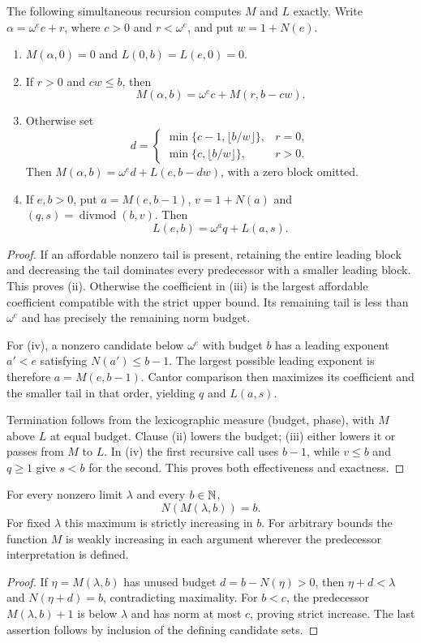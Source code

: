 \begin{theorem}\label{thm:maximum-predecessor}
The following simultaneous recursion computes $M$ and $L$ exactly.
Write $\alpha=\omega^e c+r$, where $c>0$ and $r<\omega^e$, and
put $w=1+N(e)$.
\begin{enumerate}[label=(\roman*)]
\item $M(\alpha,0)=0$ and $L(0,b)=L(e,0)=0$.
\item If $r>0$ and $cw\le b$, then
\[
 M(\alpha,b)=\omega^e c+M(r,b-cw).
\]
\item Otherwise set
\[
 d=\begin{cases}
 \min\{c-1,\lfloor b/w\rfloor\},&r=0,\\
 \min\{c,\lfloor b/w\rfloor\},&r>0.
 \end{cases}
\]
Then $M(\alpha,b)=\omega^e d+L(e,b-dw)$, with a zero block
omitted.
\item If $e,b>0$, put $a=M(e,b-1)$, $v=1+N(a)$ and
$(q,s)=\operatorname{divmod}(b,v)$.  Then
\[
 L(e,b)=\omega^a q+L(a,s).
\]
\end{enumerate}
\end{theorem}
\begin{proof}
If an affordable nonzero tail is present, retaining the entire leading
block and decreasing the tail dominates every predecessor with a smaller
leading block.  This proves (ii).  Otherwise the coefficient in (iii)
is the largest affordable coefficient compatible with the strict upper
bound.  Its remaining tail is less than $\omega^e$ and has precisely
the remaining norm budget.

For (iv), a nonzero candidate below $\omega^e$ with budget $b$ has
a leading exponent $a'<e$ satisfying $N(a')\le b-1$.
The largest possible leading exponent is therefore $a=M(e,b-1)$.
Cantor comparison then maximizes its coefficient and the smaller tail
in that order, yielding $q$ and $L(a,s)$.

Termination follows from the lexicographic measure (budget, phase),
with $M$ above $L$ at equal budget.  Clause (ii) lowers the budget;
(iii) either lowers it or passes from $M$ to $L$.  In (iv) the first
recursive call uses $b-1$, while $v\le b$ and $q\ge1$ give $s<b$
for the second.  This proves both effectiveness and exactness.
\end{proof}

\begin{lemma}\label{lem:limit-saturation}
For every nonzero limit $\lambda$ and every $b\in\mathbb N$,
\[
 N(M(\lambda,b))=b.
\]
For fixed $\lambda$ this maximum is strictly increasing in $b$.
For arbitrary bounds the function $M$ is weakly increasing in each
argument wherever the predecessor interpretation is defined.
\end{lemma}
\begin{proof}
If $\eta=M(\lambda,b)$ has unused budget $d=b-N(\eta)>0$,
then $\eta+d<\lambda$ and $N(\eta+d)=b$, contradicting
maximality.  For $b<c$, the predecessor $M(\lambda,b)+1$ is
below $\lambda$ and has norm at most $c$, proving strict increase.
The last assertion follows by inclusion of the defining candidate sets.
\end{proof}

